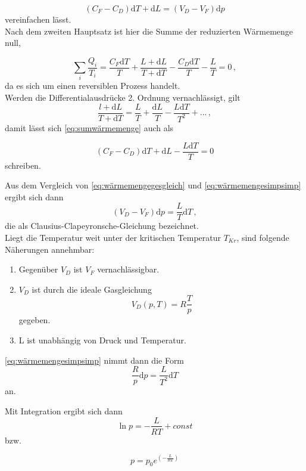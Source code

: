 \begin{equation}
    (C_F - C_D) \mathrm{d}T + \mathrm{d}L = (V_D - V_F) \mathrm{d}p
    \label{eq:wärmemengegesgleich}
\end{equation} vereinfachen lässt. \\

Nach dem zweiten Hauptsatz ist hier die Summe der reduzierten Wärmemenge null,

\begin{equation}
    \sum_i \frac{Q_i}{T_i} = \frac{C_F \mathrm{d}T}{T} + \frac{L + \mathrm{d}L}{T + \mathrm{d}T} - \frac{C_D \mathrm{d}T}{T} - \frac{L}{T} = 0 \,,
    \label{eq:sumwärmemenge}
\end{equation} da es sich um einen reversiblen Prozess handelt. \\

Werden die Differentialausdrücke 2. Ordnung vernachlässigt, gilt
\begin{equation}
    \frac{l + \mathrm{d}L}{T + \mathrm{d}T} = \frac{L}{T} + \frac{\mathrm{d}L}{T} - \frac{L \mathrm{d}T}
    {T^2} + ... \,,
    \label{eq:sumwärmemengesimp}
\end{equation} damit lässt sich \eqref{eq:sumwärmemenge} auch als

\begin{equation}
    (C_F - C_D) \mathrm{d}T + \mathrm{d}L - \frac{L \mathrm{d}T}{T} = 0 
    \label{eq:wärmemengesimpsimp}
\end{equation} schreiben.

Aus dem Vergleich von \eqref{eq:wärmemengegesgleich} und \eqref{eq:wärmemengesimpsimp} ergibt sich dann
\begin{equation}
    (V_D - V_F) \mathrm{d}p = \frac{L}{T} \mathrm{d}T \,,
    \label{eq:clausiusclapeyronschegleichung}
\end{equation} die als Clausius-Clapeyronsche-Gleichung bezeichnet. \\

Liegt die Temperatur weit unter der kritischen Temperatur $T_{Kr}$, sind folgende Näherungen annehmbar:
\begin{enumerate}
    \item Gegenüber $V_D$ ist $V_F$ vernachlässigbar.
    \item $V_D$ ist durch die ideale Gasgleichung 
    \begin{equation}
        V_D(p,T) = R \frac{T}{p}
    \end{equation} gegeben.
    \item L ist unabhängig von Druck und Temperatur.
\end{enumerate}

\eqref{eq:wärmemengesimpsimp} nimmt dann die Form
\begin{equation}
    \frac{R}{p} \mathrm{d}p = \frac{L}{T^2} \mathrm{d}T
\end{equation} an.

Mit Integration ergibt sich dann
\begin{equation}
    \ln p = - \frac{L}{RT} + const
\end{equation} bzw.

\begin{equation}
    p = p_0 e^{\left(-\frac{L}{RT}\right)}
\end{equation}


